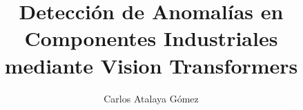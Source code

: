 
\title{Detección de Anomalías en Componentes Industriales mediante Vision Transformers}
\author{Carlos Atalaya Gómez}








\address{UCLM --- Escuela de Ingeniería Industrial y Aeroespacial\\
    Campus Universitario de la Real Fábrica de Armas}
